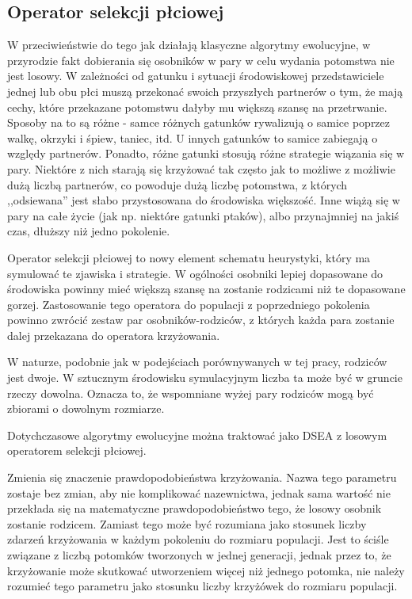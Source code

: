 \documentclass[./FM_mgr.tex]{subfiles}
\begin{document}
\subsection{Operator selekcji płciowej} \label{subsection:new_genSel}

W przeciwieństwie do tego jak działają klasyczne algorytmy ewolucyjne, w przyrodzie fakt dobierania się osobników w pary w celu wydania potomstwa nie jest losowy.
W zależności od gatunku i sytuacji środowiskowej przedstawiciele jednej lub obu płci muszą przekonać swoich przyszłych partnerów o tym, że mają cechy, które przekazane potomstwu dałyby mu większą szansę na przetrwanie.
Sposoby na to są różne - samce różnych gatunków rywalizują o samice poprzez walkę, okrzyki i śpiew, taniec, itd. 
U innych gatunków to samice zabiegają o względy partnerów.
Ponadto, różne gatunki stosują różne strategie wiązania się w pary.
Niektóre z nich starają się krzyżować tak często jak to możliwe z możliwie dużą liczbą partnerów, co powoduje dużą liczbę potomstwa, z których ,,odsiewana'' jest słabo przystosowana do środowiska większość.
Inne wiążą się w pary na całe życie (jak np. niektóre gatunki ptaków), albo przynajmniej na jakiś czas, dłuższy niż jedno pokolenie.

Operator selekcji płciowej to nowy element schematu heurystyki, który ma symulować te zjawiska i strategie.
W ogólności osobniki lepiej dopasowane do środowiska powinny mieć większą szansę na zostanie rodzicami niż te dopasowane gorzej.
Zastosowanie tego operatora do populacji z poprzedniego pokolenia powinno zwrócić zestaw par osobników-rodziców, z których każda para zostanie dalej przekazana do operatora krzyżowania.

W naturze, podobnie jak w podejściach porównywanych w tej pracy, rodziców jest dwoje. 
W sztucznym środowisku symulacyjnym liczba ta może być w gruncie rzeczy dowolna. 
Oznacza to, że wspomniane wyżej pary rodziców mogą być zbiorami o dowolnym rozmiarze.

Dotychczasowe algorytmy ewolucyjne można traktować jako DSEA z losowym operatorem selekcji płciowej.

Zmienia się znaczenie prawdopodobieństwa krzyżowania. 
Nazwa tego parametru zostaje bez zmian, aby nie komplikować nazewnictwa, jednak sama wartość nie przekłada się na matematyczne prawdopodobieństwo tego, że losowy osobnik zostanie rodzicem. 
Zamiast tego może być rozumiana jako stosunek liczby zdarzeń krzyżowania w każdym pokoleniu do rozmiaru populacji. 
Jest to ściśle związane z liczbą potomków tworzonych w jednej generacji, jednak przez to, że krzyżowanie może skutkować utworzeniem więcej niż jednego potomka, nie należy rozumieć tego parametru jako stosunku liczby krzyżówek do rozmiaru populacji.
\end{document}
